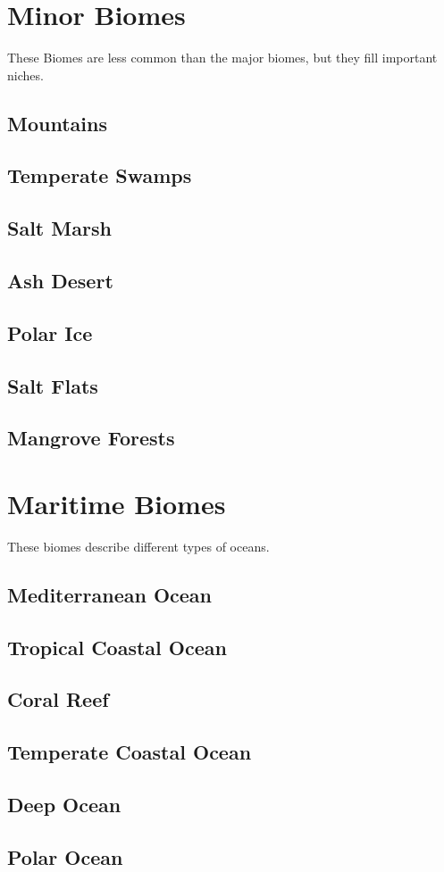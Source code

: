 \section{Minor Biomes}\label{sec:biomesMinor}
These Biomes are less common than the major biomes, but they fill important niches.

\subsection{Mountains}\label{subsec:biomeMountains}
\subsection{Temperate Swamps}\label{subsec:temperateSwamps}
\subsection{Salt Marsh}\label{subsec:saltMarsh}
\subsection{Ash Desert}\label{subsec:ashDesert}
\subsection{Polar Ice}\label{subsec:polarIce}
\subsection{Salt Flats}\label{subsec:saltFlats}
\subsection{Mangrove Forests}\label{subsec:mangroveForest}

\section{Maritime Biomes}\label{sec:biomesMaritime}
These biomes describe different types of oceans.

\subsection{Mediterranean Ocean}\label{subsec:biomeMediterraneanOcean}
\subsection{Tropical Coastal Ocean}\label{subsec:biomeCoastalOcean}
\subsection{Coral Reef}\label{subsec:biomeCoralReef}
\subsection{Temperate Coastal Ocean}\label{subsec:biomeTemperateCoastalOcean}
\subsection{Deep Ocean}\label{subsec:biomeDeepOcean}
\subsection{Polar Ocean}\label{subsec:biomePolarOcean}